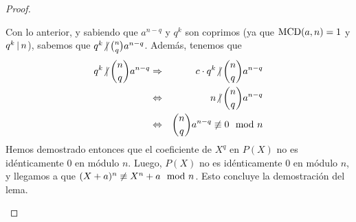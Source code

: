 \begin{proof}
\begin{itemize}
			Con lo anterior, y sabiendo que $a^{n-q}$ y $q^k$ son coprimos (ya que ${\rm MCD}(a,n) = 1$ y $q^k\hspace{1.8pt}|\hspace{1.8pt}  n$), sabemos que $q^k\text{$\not|$}\hspace{1.8pt} {n\choose q} a^{n-q}$. Además, tenemos que
			\begin{eqnarray*}
				q^k\text{$\not|$}\hspace{1.8pt} {n\choose q} a^{n-q}
				& \Rightarrow & c\cdot q^k\text{$\not|$}\hspace{1.8pt} {n\choose q} a^{n-q}\\
				&  \Leftrightarrow &n\text{$\not|$}\hspace{1.8pt} {n\choose q} a^{n-q}\\
				&  \Leftrightarrow& {n \choose q}a^{n-q} \not \equiv 0 \mod n
			\end{eqnarray*} 
			Hemos demostrado entonces que el coeficiente de $X^q$ en $P(X)$ no es idénticamente 0 en módulo $n$.
Luego, $P(X)$ no es idénticamente 0 en módulo $n$, y llegamos a que $(X+a)^n \not \equiv X^n+a \mod n$. Esto concluye la demostración del lema.		%
\end{itemize}
	\end{proof}
	

	
